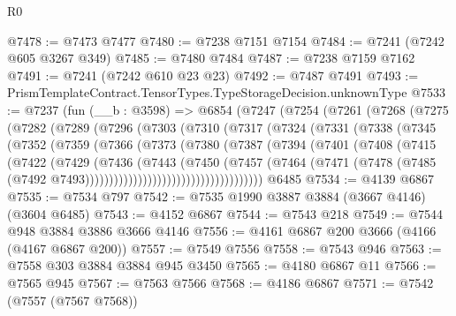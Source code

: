 \begin{lexlean}{R0}
\begin{coremodule}
@7478 := @7473 @7477
@7480 := @7238 @7151 @7154
@7484 := @7241 (@7242 @605 @3267 @349)
@7485 := @7480 @7484
@7487 := @7238 @7159 @7162
@7491 := @7241 (@7242 @610 @23 @23)
@7492 := @7487 @7491
@7493 := PrismTemplateContract.TensorTypes.TypeStorageDecision.unknownType
@7533 := @7237
    (fun (__b : @3598) =>
    @6854
      (@7247
        (@7254
          (@7261
            (@7268
              (@7275
                (@7282
                  (@7289
                    (@7296
                      (@7303
                        (@7310
                          (@7317
                            (@7324
                              (@7331
                                (@7338
                                  (@7345
                                    (@7352
                                      (@7359
                                        (@7366
                                          (@7373
                                            (@7380
                                              (@7387
                                                (@7394
                                                  (@7401
                                                    (@7408
                                                      (@7415
                                                        (@7422
                                                          (@7429
                                                            (@7436
                                                              (@7443
                                                                (@7450
                                                                  (@7457
                                                                    (@7464
                                                                      (@7471
                                                                        (@7478
                                                                          (@7485
                                                                            (@7492
                                                                              @7493)))))))))))))))))))))))))))))))))))))
    @6485
@7534 := @4139 @6867
@7535 := @7534 @797
@7542 := @7535 @1990 @3887 @3884 (@3667 @4146) (@3604 @6485)
@7543 := @4152 @6867
@7544 := @7543 @218
@7549 := @7544 @948 @3884 @3886 @3666 @4146
@7556 := @4161 @6867 @200 @3666 (@4166 (@4167 @6867 @200))
@7557 := @7549 @7556
@7558 := @7543 @946
@7563 := @7558 @303 @3884 @3884 @945 @3450
@7565 := @4180 @6867 @11
@7566 := @7565 @945
@7567 := @7563 @7566
@7568 := @4186 @6867
@7571 := @7542 (@7557 (@7567 @7568))

\end{coremodule}
\end{lexlean}

